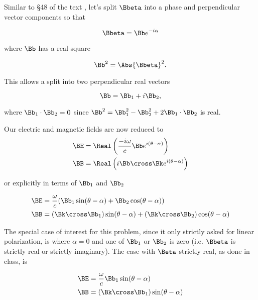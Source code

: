 Similar to \S 48 of the text \cite{landau1980classical}, let's split $\Bbeta$ into a phase and perpendicular vector components so that

\begin{equation}\label{eqn:relElectroDynProblemSet4:130}
\Bbeta = \Bb e^{-i\alpha}
\end{equation}

where $\Bb$ has a real square

\begin{equation}\label{eqn:relElectroDynProblemSet4:150}
\Bb^2 = \Abs{\Bbeta}^2.
\end{equation}

This allows a split into two perpendicular real vectors

\begin{equation}\label{eqn:relElectroDynProblemSet4:170}
\Bb = \Bb_1 + i \Bb_2,
\end{equation}

where $\Bb_1 \cdot \Bb_2 = 0$ since $\Bb^2 = \Bb_1^2 - \Bb_2^2 + 2 \Bb_1 \cdot \Bb_2$ is real.

Our electric and magnetic fields are now reduced to
\begin{align}\label{eqn:relElectroDynProblemSet4:190}
\BE &= \Real \left( \frac{-i\omega}{c} \Bb e^{i(\theta - \alpha)} \right) \\
\BB &= \Real \left( i \Bb \cross \Bk e^{i(\theta - \alpha)} \right) 
\end{align}

or explicitly in terms of $\Bb_1$ and $\Bb_2$ 

\begin{align}\label{eqn:relElectroDynProblemSet4:210}
\BE &= \frac{\omega}{c} ( \Bb_1 \sin(\theta-\alpha) + \Bb_2 \cos(\theta-\alpha)) \\
\BB &= ( \Bk \cross \Bb_1 ) \sin(\theta-\alpha) + (\Bk \cross \Bb_2) \cos(\theta-\alpha) 
\end{align}

The special case of interest for this problem, since it only strictly asked for linear polarization, is where $\alpha = 0$ and one of $\Bb_1$ or $\Bb_2$ is zero (i.e. $\Bbeta$ is strictly real or strictly imaginary).  The case with $\Beta$ strictly real, as done in class, is

\begin{align}\label{eqn:relElectroDynProblemSet4:230}
\BE &= \frac{\omega}{c} \Bb_1 \sin(\theta-\alpha) \\
\BB &= ( \Bk \cross \Bb_1 ) \sin(\theta-\alpha) 
\end{align}

